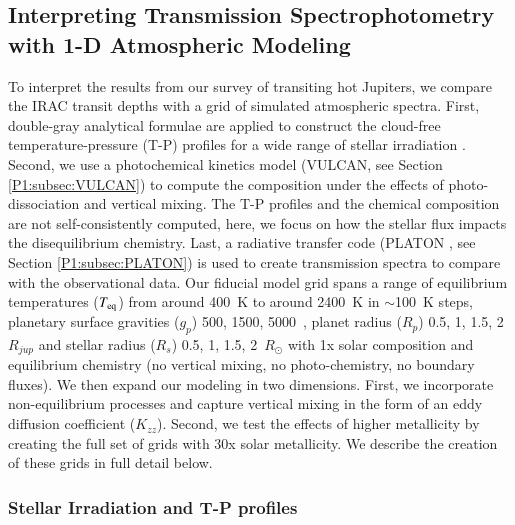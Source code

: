 \subsection{Interpreting Transmission Spectrophotometry with 1-D Atmospheric Modeling}
\label{P1:sec:modelgrid}

To interpret the results from our survey of transiting hot Jupiters, we compare the IRAC transit depths with a grid of simulated atmospheric spectra. First, double-gray analytical formulae are applied to construct the cloud-free temperature-pressure (T-P) profiles for a wide range of stellar irradiation \citet{Heng2014}. Second, we use a photochemical kinetics model (VULCAN, \citet{Tsai2017} see Section \ref{P1:subsec:VULCAN}) to compute the composition under the effects of photo-dissociation and vertical mixing. The T-P profiles and the chemical composition are not self-consistently computed, here, we focus on how the stellar flux impacts the disequilibrium chemistry. Last, a radiative transfer code (PLATON \citet{Zhang2019}, see Section \ref{P1:subsec:PLATON}) is used to create transmission spectra to compare with the observational data. Our fiducial model grid spans a range of equilibrium temperatures ($T_{\rm eq}$) from around 400~K to around 2400~K in $\sim$100~K steps, planetary surface gravities ($g_p$) 500, 1500, 5000~\cmss, planet radius ($R_p$) 0.5, 1, 1.5, 2~$R_{jup}$ and stellar radius ($R_s$) 0.5, 1, 1.5, 2~$R_{\odot}$ with 1x solar composition and equilibrium chemistry (no vertical mixing, no photo-chemistry, no boundary fluxes). We then expand our modeling in two dimensions. First, we incorporate non-equilibrium processes and capture vertical mixing in the form of an eddy diffusion coefficient ($K_{zz}$). Second, we test the effects of higher metallicity by creating the full set of grids with 30x solar metallicity. We describe the creation of these grids in full detail below.

\subsubsection{Stellar Irradiation and T-P profiles}
\label{P1:subsec:TPcreation}

